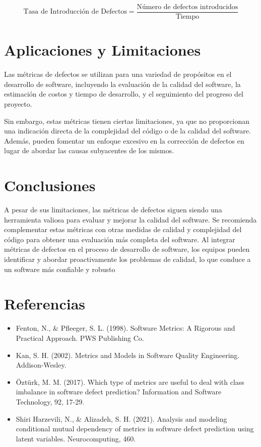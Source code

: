 \documentclass{article}
\begin{document}
\begin{equation}
  \text{Tasa de Introducción de Defectos} = \frac{\text{Número de defectos introducidos}}{\text{Tiempo}}
\end{equation}


\section{Aplicaciones y Limitaciones}

Las métricas de defectos se utilizan para una variedad de propósitos en el desarrollo de software, incluyendo la evaluación de la calidad del software, la estimación de costos y tiempo de desarrollo, y el seguimiento del progreso del proyecto. 



Sin embargo, estas métricas tienen ciertas limitaciones, ya que no proporcionan una indicación directa de la complejidad del código o de la calidad del software. Además, pueden fomentar un enfoque excesivo en la corrección de defectos en lugar de abordar las causas subyacentes de los mismos.

\section{Conclusiones}

A pesar de sus limitaciones, las métricas de defectos siguen siendo una herramienta valiosa para evaluar y mejorar la calidad del software. Se recomienda complementar estas métricas con otras medidas de calidad y complejidad del código para obtener una evaluación más completa del software. Al integrar métricas de defectos en el proceso de desarrollo de software, los equipos pueden identificar y abordar proactivamente los problemas de calidad, lo que conduce a un software más confiable y robusto

\section{Referencias}

\begin{itemize}
    \item Fenton, N., \& Pfleeger, S. L. (1998). Software Metrics: A Rigorous and Practical Approach. PWS Publishing Co.
    \item Kan, S. H. (2002). Metrics and Models in Software Quality Engineering. Addison-Wesley.
    \item Öztürk, M. M. (2017). Which type of metrics are useful to deal with class imbalance in software defect prediction? Information and Software Technology, 92, 17-29.
    \item Shiri Harzevili, N., \& Alizadeh, S. H. (2021). Analysis and modeling conditional mutual dependency of metrics in software defect prediction using latent variables. Neurocomputing, 460.
\end{itemize}
\end{document}
